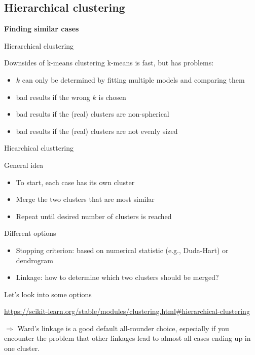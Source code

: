 \documentclass[compress]{beamer}
\begin{document}
\subsection{Hierarchical clustering}

\begin{frame}[plain]
\textbf{Finding similar cases}

Hierarchical clustering
\end{frame}

\begin{frame}{Downsides of k-means clustering}
k-means is fast, but has problems:

\begin{itemize}
\item $k$ can only be determined by fitting multiple models and comparing them
\item bad results if the wrong $k$ is chosen
\item bad results if the (real) clusters are non-spherical
\item bad results if the (real) clusters are not evenly sized
\end{itemize}
\end{frame}


\begin{frame}{Hiearchical clusttering}
\begin{block}{General idea}
\begin{itemize}
\item To start, each case has its own cluster
\item Merge the two clusters that are most similar
\item Repeat until desired number of clusters is reached
\end{itemize}

\end{block}

\pause

\begin{block}{Different options}
\begin{itemize}
\item Stopping criterion: based on numerical statistic (e.g., Duda-Hart) or dendrogram
\item Linkage: how to determine which two clusters should be merged?
\end{itemize}

\end{block}
\end{frame}


\begin{frame}{Let's look into some options}

\url{https://scikit-learn.org/stable/modules/clustering.html\#hierarchical-clustering}

$\Rightarrow$ Ward's linkage is a good default all-rounder choice, especially if you encounter the problem that other linkages lead to almost all cases ending up in one cluster. 
\end{frame}
\end{document}
